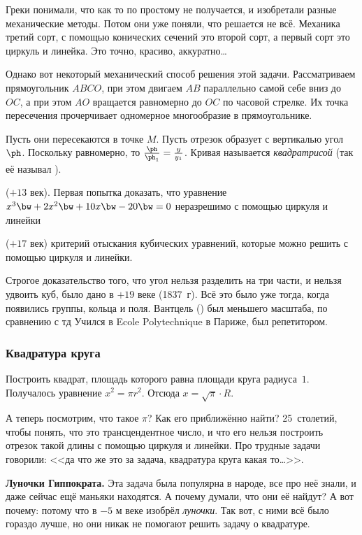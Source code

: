 \documentclass[a4paper,oneside,fleqn,10pt]{article}
\begin{document}
Греки понимали, что как то по простому не получается, и изобретали разные механические
методы. Потом они уже поняли, что решается не всё. Механика третий сорт, с помощью конических сечений
это второй сорт, а первый сорт это циркуль и линейка. Это точно, красиво, аккуратно\ldots

Однако вот некоторый механический способ решения этой задачи.
Рассматриваем прямоугольник $ABCO$, при этом двигаем $AB$ параллельно самой себе вниз
до $OC$, а при этом $AO$ вращается равномерно до $OC$ по часовой стрелке.
Их точка пересечения прочерчивает одномерное многообразие в прямоугольнике.



Пусть они пересекаются в точке $M$.  Пусть отрезок образует с вертикалью угол $\ph$.
Поскольку равномерно, то $\frac{\ph}{\ph_1} = \frac{y}{y_1}$.
Кривая называется \emph{квадратрисой} (так её называл ).

 ($+13$ век). Первая попытка доказать, что уравнение $x^3 \bw+ 2x^2 \bw+ 10x \bw- 20 \bw= 0$
неразрешимо с помощью циркуля и линейки 

 ($+17$ век) критерий отыскания кубических уравнений, которые можно решить с помощью циркуля и линейки.

Строгое доказательство того, что угол нельзя разделить на три части,  и нельзя удвоить куб,
было дано  в $+19$ веке (1837~г).
Всё это было уже тогда, когда появились группы, кольца
и поля. Вантцель () был меньшего масштаба, по сравнению с  тд
Учился в Ecole Polytechnique в Париже, был репетитором.

\subsubsection{Квадратура круга}

Построить квадрат, площадь которого равна площади круга радиуса~$1$.
Получалось уравнение $x^2 = \pi r^2$. Отсюда $x = \sqrt\pi \cdot R$.

А теперь посмотрим, что такое $\pi$?
Как его приближённо найти? 25~столетий, чтобы понять, что это трансцендентное число,
и что его нельзя построить отрезок такой длины с помощью циркуля и линейки.
Про трудные задачи говорили: <<да что же это за задача, квадратура круга какая то\ldots>>.


\textbf{Луночки Гиппократа.}
Эта задача была популярна в народе, все про неё знали, и даже сейчас ещё маньяки находятся.
А почему думали, что они её найдут? А вот почему: потому что  в $-5$ м веке
изобрёл \emph{луночки}.
Так вот, с ними всё было гораздо лучше, но они никак не помогают решить задачу о квадратуре.
\end{document}
